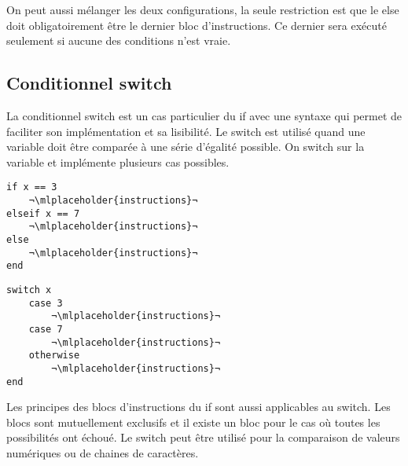 \documentclass{tufte-handout}
\begin{document}
On peut aussi mélanger les deux configurations, la seule restriction est que le else doit obligatoirement être le dernier bloc d'instructions. Ce dernier sera exécuté seulement si aucune des conditions n'est vraie.

\subsection{Conditionnel switch}
La conditionnel switch est un cas particulier du if avec une syntaxe qui permet de faciliter son implémentation et sa lisibilité.
Le switch est utilisé quand une variable doit être comparée à une série d'égalité possible. On switch sur la variable et implémente plusieurs cas possibles.
\begin{fullwidth}
    \begin{minipage}{.45\linewidth}
    \begin{lstlisting}[title={Structure d'un if pouvant être un switch}]
if x == 3
    ¬\mlplaceholder{instructions}¬
elseif x == 7
    ¬\mlplaceholder{instructions}¬
else
    ¬\mlplaceholder{instructions}¬
end
    \end{lstlisting}
    \end{minipage}\hfill
    \begin{minipage}{.45\linewidth}
    \begin{lstlisting}[title={Structure du switch}]
switch x
    case 3
        ¬\mlplaceholder{instructions}¬
    case 7
        ¬\mlplaceholder{instructions}¬
    otherwise
        ¬\mlplaceholder{instructions}¬
end
    \end{lstlisting}
    \end{minipage}
\end{fullwidth}
Les principes des blocs d'instructions du if sont aussi applicables au switch. Les blocs sont mutuellement exclusifs et il existe un bloc pour le cas où toutes les possibilités ont échoué.
Le switch peut être utilisé pour la comparaison de valeurs numériques ou de chaines de caractères.


\end{document}
